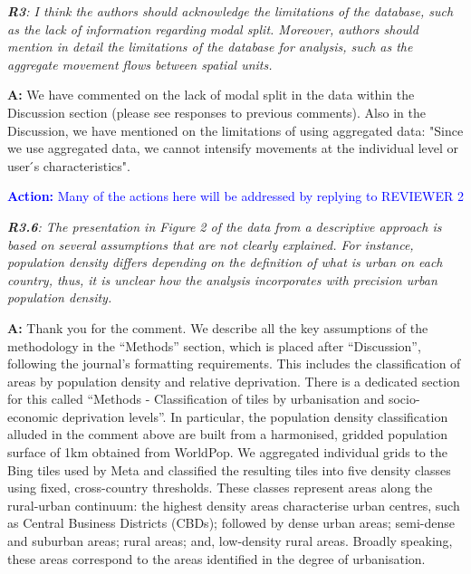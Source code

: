 \documentclass[12pt,a4paper,oneside, reqno]{amsart}
\begin{document}
\setlength{\leftskip}{1cm} \textit{\textbf{R3}: I think the authors should acknowledge the limitations of the database, such as the lack of information regarding modal split. Moreover, authors should mention in detail the limitations of the database for analysis, such as the aggregate movement flows between spatial units.}

\setlength{\leftskip}{1cm}\textbf{A:}  We have commented on the lack of modal split in the data within the Discussion section (please see responses to previous comments). Also in the Discussion, we have mentioned on the limitations of using aggregated data: "Since we use aggregated data, we cannot intensify movements at the individual level or user ́s characteristics".

\textcolor{blue}{\textbf{Action:} Many of the actions here will be addressed by replying to REVIEWER 2}

\setlength{\leftskip}{0cm} \textit{\textbf{R3.6}: The presentation in Figure 2 of the data from a descriptive approach is based on several assumptions that are not clearly explained. For instance, population density differs depending on the definition of what is urban on each country, thus, it is unclear how the analysis incorporates with precision urban population density.}

\setlength{\leftskip}{1cm}\textbf{A:} Thank you for the comment. We describe all the key assumptions of the methodology in the ``Methods'' section, which is placed after ``Discussion'', following the journal's formatting requirements. This includes the classification of areas by population density and relative deprivation. There is a dedicated section for this called ``Methods - Classification of tiles by urbanisation and socio-economic deprivation levels''. In particular, the population density classification alluded in the comment above are built from a harmonised, gridded population surface of 1km obtained from WorldPop. We aggregated individual grids to the Bing tiles used by Meta and classified the resulting tiles into five density classes using fixed, cross-country thresholds. These classes represent areas along the rural-urban continuum: the highest density areas characterise urban centres, such as Central Business Districts (CBDs); followed by dense urban areas; semi-dense and suburban areas; rural areas; and, low-density rural areas. Broadly speaking, these areas correspond to the areas identified in the degree of urbanisation.
\end{document}
